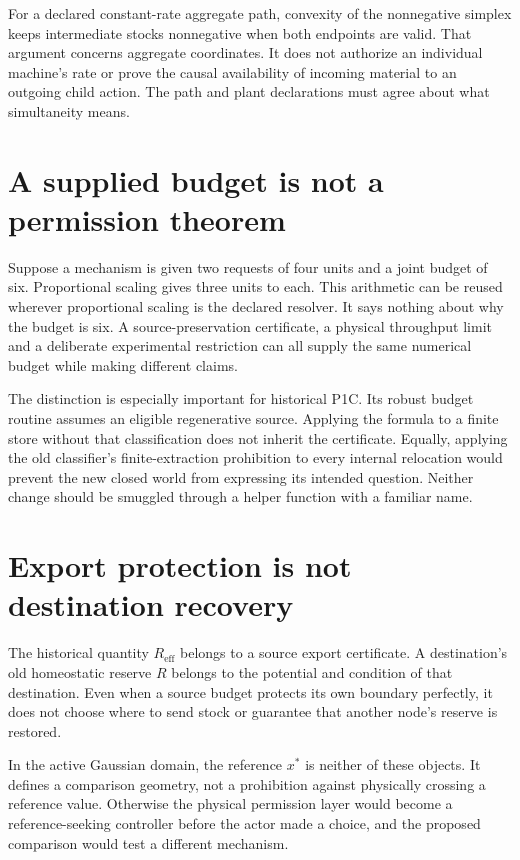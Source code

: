 For a declared constant-rate aggregate path, convexity of the nonnegative
simplex keeps intermediate stocks nonnegative when both endpoints are valid.
That argument concerns aggregate coordinates. It does not authorize an
individual machine's rate or prove the causal availability of incoming
material to an outgoing child action. The path and plant declarations must
agree about what simultaneity means.

\section{A supplied budget is not a permission theorem}
Suppose a mechanism is given two requests of four units and a joint budget
of six. Proportional scaling gives three units to each. This arithmetic can
be reused wherever proportional scaling is the declared resolver. It says
nothing about why the budget is six. A source-preservation certificate,
a physical throughput limit and a deliberate experimental restriction can
all supply the same numerical budget while making different claims.

The distinction is especially important for historical P1C. Its robust
budget routine assumes an eligible regenerative source. Applying the
formula to a finite store without that classification does not inherit the
certificate. Equally, applying the old classifier's finite-extraction
prohibition to every internal relocation would prevent the new closed world
from expressing its intended question. Neither change should be smuggled
through a helper function with a familiar name.

\section{Export protection is not destination recovery}
The historical quantity $R_{\mathrm{eff}}$ belongs to a source export
certificate. A destination's old homeostatic reserve $R$ belongs to the
potential and condition of that destination. Even when a source budget
protects its own boundary perfectly, it does not choose where to send stock
or guarantee that another node's reserve is restored.

In the active Gaussian domain, the reference $x^*$ is neither of these
objects. It defines a comparison geometry, not a prohibition against
physically crossing a reference value. Otherwise the physical permission
layer would become a reference-seeking controller before the actor made a
choice, and the proposed comparison would test a different mechanism.

